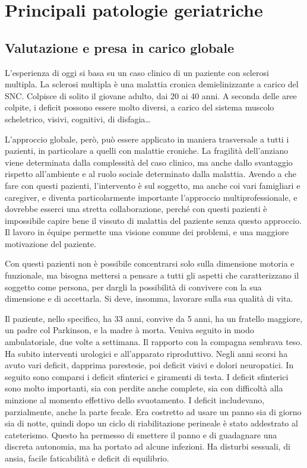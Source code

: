 \chapter{Principali patologie geriatriche}
\section{Valutazione e presa in carico globale}
L'esperienza di oggi si basa su un caso clinico di un paziente con sclerosi 
multipla.
La sclerosi multipla è una malattia cronica demielinizzante a carico del SNC.
Colpisce di solito il giovane adulto, dai 20 ai 40 anni. A seconda delle aree 
colpite, i deficit possono essere molto diversi, a carico del sistema 
muscolo scheletrico, visivi, cognitivi, di disfagia\dots

L'approccio globale, però, può essere applicato in maniera trasversale a 
tutti 
i pazienti, in particolare a quelli con malattie croniche. La fragilità 
dell'anziano viene determinata dalla complessità del caso clinico, ma anche 
dallo svantaggio rispetto all'ambiente e al ruolo sociale determinato dalla 
malattia. Avendo a che fare con questi pazienti, l'intervento è sul soggetto, 
ma anche coi vari famigliari e caregiver, e diventa particolarmente importante 
l'approccio multiprofessionale, e dovrebbe esserci una stretta collaborazione, 
perché con questi pazienti è impossibile capire bene il vissuto di malattia 
del paziente senza questo approccio. Il lavoro in équipe permette una visione 
comune dei problemi, e una maggiore motivazione del paziente.

Con questi pazienti non è possibile concentrarsi solo sulla dimensione motoria 
e funzionale, ma bisogna mettersi a pensare a tutti gli aspetti che 
caratterizzano il soggetto come persona, per dargli la possibilità di convivere 
con la sua dimensione e di accettarla. Si deve, insomma, lavorare sulla sua 
qualità di vita.

Il paziente, nello specifico, ha 33 anni, convive da 5 anni, ha un fratello 
maggiore, un padre col Parkinson, e la madre à morta. Veniva seguito in modo 
ambulatoriale, due volte a settimana. Il rapporto con la compagna sembrava 
teso. Ha subito interventi urologici e all'apparato riproduttivo. Negli anni 
scorsi ha avuto vari deficit, dapprima parestesie, poi deficit visivi e dolori 
neuropatici. In seguito sono comparsi i deficit sfinterici e giramenti di 
testa. I deficit sfinterici sono molto importanti, sia con perdite anche 
complete, sia con difficoltà alla minzione al momento effettivo dello 
svuotamento. I deficit includevano, parzialmente, anche la parte fecale. Era 
costretto ad usare un panno sia di giorno sia di notte, quindi dopo un ciclo di 
riabilitazione perineale è stato addestrato al cateterismo. Questo ha permesso 
di smettere il panno e di guadagnare una discreta autonomia, ma ha portato ad 
alcune infezioni. Ha disturbi sessuali, di ansia, facile faticabilità e deficit 
di equilibrio.

